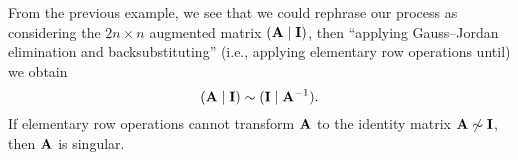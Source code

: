 From the previous example, we see that we could rephrase our process as
considering the $2n\times n$ augmented matrix $(\mathbf{A}\mid\mathbf{I})$,
then ``applying Gauss--Jordan elimination and backsubstituting'' (i.e.,
applying elementary row operations until) we obtain
\begin{equation}
(\mathbf{A}\mid\mathbf{I})\sim(\mathbf{I}\mid\mathbf{A}^{-1}).
\end{equation}
If elementary row operations cannot transform $\mathbf{A}$ to the identity
matrix $\mathbf{A}\not\sim\mathbf{I}$, then $\mathbf{A}$ is singular.